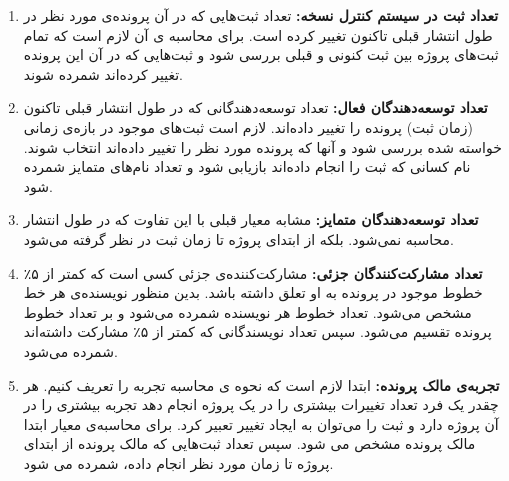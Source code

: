 \begin{enumerate}
	\item
	\textbf{تعداد ثبت در سیستم کنترل نسخه:}
	تعداد ثبت‌هایی که در آن پرونده‌ی ‌مورد نظر در طول انتشار قبلی تاکنون تغییر کرده است. برای محاسبه ی آن لازم است که تمام ثبت‌های پروژه بین ثبت کنونی و  قبلی بررسی شود و ثبت‌هایی که در آن این پرونده تغییر کرده‌اند شمرده شوند.
	\item
	\textbf{تعداد توسعه‌دهندگان 
		فعال:}
	تعداد توسعه‌دهندگانی که در طول انتشار قبلی تاکنون (زمان ثبت) پرونده را تغییر داده‌اند. لازم است ثبت‌های موجود در باز‌ه‌ی زمانی خواسته شده بررسی شود و آنها که پرونده مورد نظر را تغییر داده‌اند انتخاب شوند. نام کسانی که ثبت را انجام داده‌اند بازیابی شود و تعداد نام‌های متمایز شمرده شود. 
	\item
	\textbf{تعداد توسعه‌دهندگان	متمایز:}
	مشابه معیار قبلی با این تفاوت که در طول انتشار محاسبه نمی‌شود. بلکه از ابتدای پروژه تا زمان ثبت در نظر گرفته می‌شود. 
	\item
	\textbf{تعداد مشارکت‌کنندگان جزئی:}
	مشارکت‌کننده‌ی جزئی کسی است که کمتر از ۵٪ خطوط موجود در پرونده به او تعلق داشته باشد. بدین منظور نویسنده‌ی هر خط مشخص می‌شود. تعداد خطوط هر نویسنده شمرده می‌شود و بر تعداد خطوط پرونده تقسیم می‌شود. سپس تعداد نویسندگانی که کمتر از ۵٪ مشارکت داشته‌اند شمرده می‌شود. 
\item
\textbf{تجربه‌ی مالک پرونده:}
	ابتدا لازم است که نحوه ی محاسبه تجربه را تعریف کنیم. هر چقدر یک فرد تعداد تغییرات بیشتری را در یک پروژه انجام دهد تجربه بیشتری را در آن پروژه دارد و ثبت را می‌توان به ایجاد تغییر تعبیر کرد. برای محاسبه‌ی معیار ابتدا مالک پرونده مشخص می شود. سپس تعداد ثبت‌هایی که مالک پرونده از ابتدای پروژه تا زمان مورد نظر انجام داده، شمرده می شود.
\end{enumerate}

